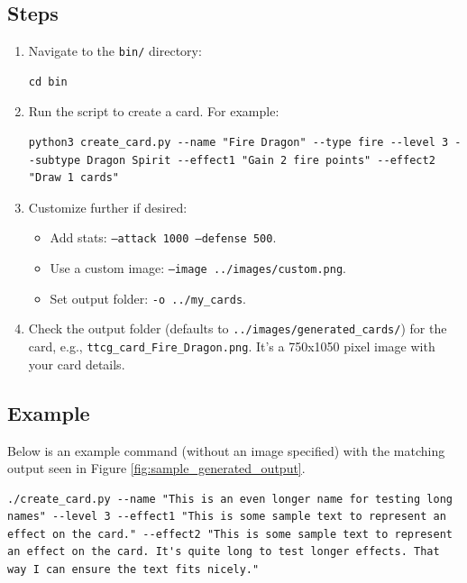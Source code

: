 \subsection{Steps}
\begin{enumerate}
	\item Navigate to the \texttt{bin/} directory:
\begin{lstlisting}[style=terminalstyle]
cd bin
\end{lstlisting}
	\item Run the script to create a card. For example:
\begin{lstlisting}[style=terminalstyle]
python3 create_card.py --name "Fire Dragon" --type fire --level 3 --subtype Dragon Spirit --effect1 "Gain 2 fire points" --effect2 "Draw 1 cards"
\end{lstlisting}
	\item Customize further if desired:
	\begin{itemize}
		\item Add stats: \texttt{--attack 1000 --defense 500}.
		\item Use a custom image: \texttt{--image ../images/custom.png}.
		\item Set output folder: \texttt{-o ../my\_cards}.
	\end{itemize}
	\item Check the output folder (defaults to \texttt{../images/generated\_cards/}) for the card, e.g., \texttt{ttcg\_card\_Fire\_Dragon.png}. It’s a 750x1050 pixel image with your card details.
\end{enumerate}

\subsection{Example}
Below is an example command (without an image specified) with the matching output seen in Figure \ref{fig:sample_generated_output}.
\begin{lstlisting}[style=terminalstyle]
./create_card.py --name "This is an even longer name for testing long names" --level 3 --effect1 "This is some sample text to represent an effect on the card." --effect2 "This is some sample text to represent an effect on the card. It's quite long to test longer effects. That way I can ensure the text fits nicely."
\end{lstlisting}

